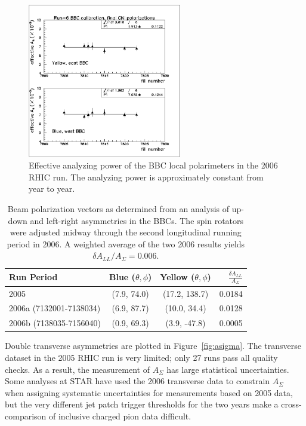 \begin{figure}
  \centering
  \includegraphics[width=0.6\textwidth]{figures/bbc-analyzing-power}
  \caption{Effective analyzing power of the BBC local polarimeters in the 2006 RHIC run.  The analyzing power is approximately constant from year to year.}
  \label{fig:bbc-analyzing-power}
\end{figure}

\begin{table}
  \begin{center}
    \begin{tabular}{l|c|c|r}
      Run Period & Blue ($\theta, \phi$) & Yellow ($\theta, \phi$) &
      $\frac{\delta A_{LL}}{A_{\Sigma}}$\\
      \hline
      2005 & (7.9, 74.0) & (17.2, 138.7) & 0.0184 \\
      2006a (7132001-7138034) & (6.9, 87.7) & (10.0, 34.4) & 0.0128 \\
      2006b (7138035-7156040) & (0.9, 69.3) & (3.9, -47.8) & 0.0005
    \end{tabular}
  \end{center}
  \caption{Beam polarization vectors as determined from an analysis of up-down and left-right asymmetries in the BBCs.  The spin rotators were adjusted midway through the second longitudinal running period in 2006.  A weighted average of the two 2006 results yields $\delta A_{LL} / A_{\Sigma} = 0.006$.}
  \label{tab:pol-vectors}
\end{table}

Double transverse asymmetries are plotted in Figure~\ref{fig:asigma}.  The transverse dataset in the 2005 RHIC run is very limited; only 27 runs pass all quality checks.  As a result, the measurement of \(A_{\Sigma}\) has large statistical uncertainties.  Some analyses at STAR have used the 2006 transverse data to constrain \(A_{\Sigma}\) when assigning systematic uncertainties for measurements based on 2005 data, but the very different jet patch trigger thresholds for the two years make a cross-comparison of inclusive charged pion data difficult.

